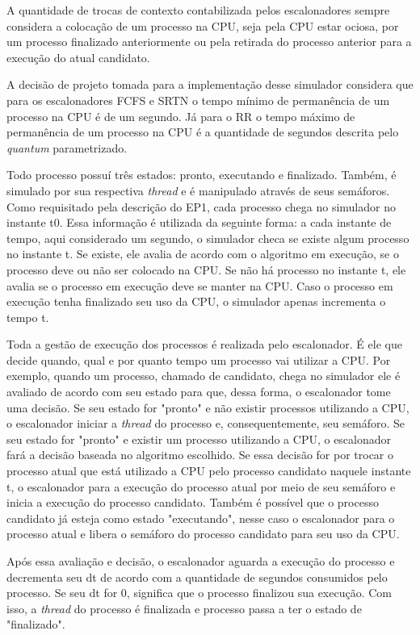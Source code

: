 \documentclass[12pt]{article}
\begin{document}
A quantidade de trocas de contexto contabilizada pelos escalonadores sempre considera a colocação de um processo na CPU, seja pela CPU estar ociosa, por um processo finalizado anteriormente ou pela retirada do processo anterior para a execução do atual candidato.

A decisão de projeto tomada para a implementação desse simulador considera que para os escalonadores FCFS e SRTN o tempo mínimo de permanência de um processo na CPU é de um segundo. Já para o RR o tempo máximo de permanência de um processo na CPU é a quantidade de segundos descrita pelo \textit{quantum} parametrizado.

Todo processo possuí três estados: pronto, executando e finalizado. Também, é simulado por sua respectiva \textit{thread} e é manipulado através de seus semáforos. Como requisitado pela descrição do EP1, cada processo chega no simulador no instante t0. Essa informação é utilizada da seguinte forma: a cada instante de tempo, aqui considerado um segundo, o simulador checa se existe algum processo no instante t. Se existe, ele avalia de acordo com o algoritmo em execução, se o processo deve ou não ser colocado na CPU. Se não há processo no instante t, ele avalia se o processo em execução deve se manter na CPU. Caso o processo em execução tenha finalizado seu uso da CPU, o simulador apenas incrementa o tempo t.

Toda a gestão de execução dos processos é realizada pelo escalonador. É ele que decide quando, qual e por quanto tempo um processo vai utilizar a CPU. Por exemplo, quando um processo, chamado de candidato, chega no simulador ele é avaliado de acordo com seu estado para que, dessa forma, o escalonador tome uma decisão. Se seu estado for "pronto" e não existir processos utilizando a CPU, o escalonador iniciar a \textit{thread} do processo e, consequentemente, seu semáforo. Se seu estado for "pronto" e existir um processo utilizando a CPU, o escalonador fará a decisão baseada no algoritmo escolhido. Se essa decisão for por trocar o processo atual que está utilizado a CPU pelo processo candidato naquele instante t, o escalonador para a execução do processo atual por meio de seu semáforo e inicia a execução do processo candidato. Também é possível que o processo candidato já esteja como estado "executando", nesse caso o escalonador para o processo atual e libera o semáforo do processo candidato para seu uso da CPU.

Após essa avaliação e decisão, o escalonador aguarda a execução do processo e decrementa seu dt de acordo com a quantidade de segundos consumidos pelo processo. Se seu dt for 0, significa que o processo finalizou sua execução. Com isso, a \textit{thread} do processo é finalizada e processo passa a ter o estado de "finalizado".
\end{document}
